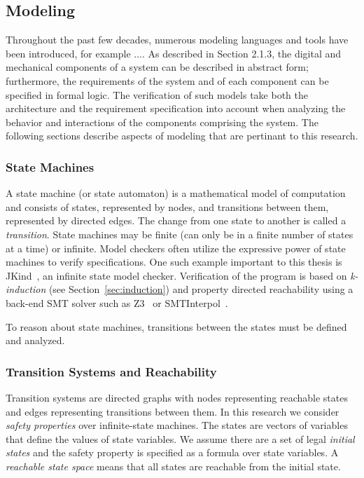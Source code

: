 \subsection{Modeling}
\label{sec:modeling}
Throughout the past few decades, numerous modeling languages and tools have been introduced, for example .... As described in Section 2.1.3, the digital and mechanical components of a system can be described in abstract form; furthermore, the requirements of the system and of each component can be specified in formal logic. The verification of such models take both the architecture and the requirement specification into account when analyzing the behavior and interactions of the components comprising the system. The following sections describe aspects of modeling that are pertinant to this research.

\subsubsection{State Machines}
A state machine (or state automaton) is a mathematical model of computation and consists of states, represented by nodes, and transitions between them, represented by directed edges. The change from one state to another is called a {\em transition}. State machines may be finite (can only be in a finite number of states at a time) or infinite. %
Model checkers often utilize the expressive power of state machines to verify specifications. One such example important to this thesis is JKind~\cite{2017arXiv171201222G}, an infinite state model checker. Verification of the program is based on {\em k-induction} (see Section~\ref{sec:induction}) and property directed reachability using a back-end SMT solver such as Z3~\cite{z3} or SMTInterpol~\cite{smtInterpol}. 

To reason about state machines, transitions between the states must be defined and analyzed.

\subsubsection{Transition Systems and Reachability}
Transition systems are directed graphs with nodes representing reachable states and edges representing transitions between them. In this research we consider \emph{safety properties} over infinite-state machines. The states are vectors of variables that define the values of state variables. We assume there are a set of legal \emph{initial states} and the safety property is specified as a formula over state variables. A \emph{reachable state space} means that all states are reachable from the initial state. 

